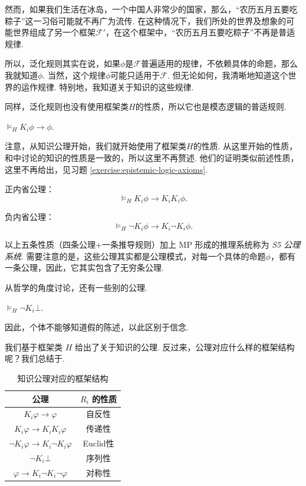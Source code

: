 然而，如果我们生活在冰岛，一个中国人非常少的国家，那么，“农历五月五要吃粽子”这一习俗可能就不再广为流传. 在这种情况下，我们所处的世界及想象的可能世界组成了另一个框架$\mathcal F'$，在这个框架中，“农历五月五要吃粽子”不再是普适规律. 

所以，泛化规则其实在说，如果$\phi$是$\mathcal F$普遍适用的规律，不依赖具体的命题，那么我就知道$\phi$. 当然，这个规律$\phi$可能只适用于$\mathcal F$. 但无论如何，我清晰地知道这个世界的运作规律. 特别地，我知道关于知识的这些规律. 

同样，泛化规则也没有使用框架类$H$的性质，所以它也是模态逻辑的普适规则. 

\begin{proposition}\label{prop:knowledge-axiom}
$\vDash_H K_i\phi\to\phi$.
\end{proposition}

注意，从知识公理开始，我们就开始使用了框架类$H$的性质. 从这里开始的性质，和中讨论的知识的性质是一致的，所以这里不再赘述. 他们的证明类似前述性质，这里不再给出，见习题 \ref{exercise:epistemic-logic-axioms}.

\begin{proposition}[内省公理]\label{prop:knowledge-introspection}
正内省公理：
\[\vDash_H K_i\phi\to K_iK_i\phi.\]

负内省公理：
\[\vDash_H \neg K_i\phi\to K_i\neg K_i\phi.\]
\end{proposition}

以上五条性质（四条公理+一条推导规则）加上 MP 形成的推理系统称为 \textit{S5 公理系统}. 需要注意的是，这些公理其实都是公理模式，对每一个具体的命题$\phi$，都有一条公理，因此，它其实包含了无穷条公理. 

从哲学的角度讨论，还有一些别的公理. 

\begin{proposition}[一致性公理]\label{prop:knowledge-consistency}
$\vDash_H\neg K_i\bot$.
\end{proposition}

因此，个体不能够知道假的陈述，以此区别于信念. 

我们基于框架类 $H$ 给出了关于知识的公理. 反过来，公理对应什么样的框架结构呢？我们总结于.

\begin{table}[ht]
\centering
    \begin{tabular}{c|c}
        \toprule 公理 &  $R_i$ 的性质 \\
        \midrule $K_i \varphi \to \varphi$ & 自反性 \\
        $K_i \varphi \to K_i K_i \varphi$ & 传递性 \\
        $\neg K_i \varphi \to K_i \neg K_i \varphi$ & Euclid性 \\
        $\neg K_i\bot$  & 序列性\\
        $\varphi \to K_i \neg K_i \neg \varphi$ & 对称性 \\
        \bottomrule
    \end{tabular}
    \caption{知识公理对应的框架结构} \label{tab:epistemic-axiom-structure}
\end{table}


